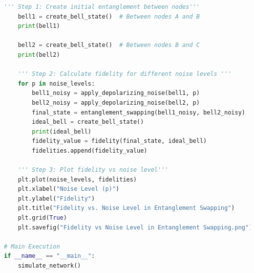 \documentclass[12pt]{ieeetj}
\begin{document}
\begin{lstlisting}[language=Python, caption=Entanglement swapping(fidelity vs polarizing noise), label=code:entanglement-swap]
    ''' Step 1: Create initial entanglement between nodes'''
    bell1 = create_bell_state()  # Between nodes A and B
    print(bell1)

    bell2 = create_bell_state()  # Between nodes B and C
    print(bell2)
    
    ''' Step 2: Calculate fidelity for different noise levels '''
    for p in noise_levels:
        bell1_noisy = apply_depolarizing_noise(bell1, p)
        bell2_noisy = apply_depolarizing_noise(bell2, p)
        final_state = entanglement_swapping(bell1_noisy, bell2_noisy)
        ideal_bell = create_bell_state()
        print(ideal_bell)
        fidelity_value = fidelity(final_state, ideal_bell)
        fidelities.append(fidelity_value)
    
    ''' Step 3: Plot fidelity vs noise level'''
    plt.plot(noise_levels, fidelities)
    plt.xlabel("Noise Level (p)")
    plt.ylabel("Fidelity")
    plt.title("Fidelity vs. Noise Level in Entanglement Swapping")
    plt.grid(True)
    plt.savefig("Fidelity vs Noise Level in Entanglement Swapping.png")   

# Main Execution
if __name__ == "__main__":
    simulate_network()

\end{lstlisting}
\end{document}
